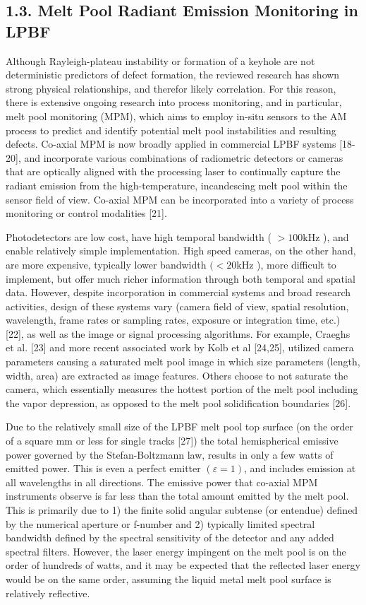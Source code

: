 \documentclass[10pt]{article}
\begin{document}
\subsection*{1.3. Melt Pool Radiant Emission Monitoring in LPBF}
Although Rayleigh-plateau instability or formation of a keyhole are not deterministic predictors of defect formation, the reviewed research has shown strong physical relationships, and therefor likely correlation. For this reason, there is extensive ongoing research into process monitoring, and in particular, melt pool monitoring (MPM), which aims to employ in-situ sensors to the AM process to predict and identify potential melt pool instabilities and resulting defects. Co-axial MPM is now broadly applied in commercial LPBF systems [18-20], and incorporate various combinations of radiometric detectors or cameras that are optically aligned with the processing laser to continually capture the radiant emission from the high-temperature, incandescing melt pool within the sensor field of view. Co-axial MPM can be incorporated into a variety of process monitoring or control modalities [21].

Photodetectors are low cost, have high temporal bandwidth ( $>100 \mathrm{kHz}$ ), and enable relatively simple implementation. High speed cameras, on the other hand, are more expensive, typically lower bandwidth $(<20 \mathrm{kHz}$ ), more difficult to implement, but offer much richer information through both temporal and spatial data. However, despite incorporation in commercial systems and broad research activities, design of these systems vary (camera field of view, spatial resolution, wavelength, frame rates or sampling rates, exposure or integration time, etc.) [22], as well as the image or signal processing algorithms. For example, Craeghs et al. [23] and more recent associated work by Kolb et al [24,25], utilized camera parameters causing a saturated melt pool image in which size parameters (length, width, area) are extracted as image features. Others choose to not saturate the camera, which essentially measures the hottest portion of the melt pool including the vapor depression, as opposed to the melt pool solidification boundaries [26].

Due to the relatively small size of the LPBF melt pool top surface (on the order of a square $\mathrm{mm}$ or less for single tracks [27]) the total hemispherical emissive power governed by the Stefan-Boltzmann law, results in only a few watts of emitted power. This is even a perfect emitter $(\varepsilon=1)$, and includes emission at all wavelengths in all directions. The emissive power that co-axial MPM instruments observe is far less than the total amount emitted by the melt pool. This is primarily due to 1) the finite solid angular subtense (or entendue) defined by the numerical aperture or f-number and 2) typically limited spectral bandwidth defined by the spectral sensitivity of the detector and any added spectral filters. However, the laser energy impingent on the melt pool is on the order of hundreds of watts, and it may be expected that the reflected laser energy would be on the same order, assuming the liquid metal melt pool surface is relatively reflective.
\end{document}
